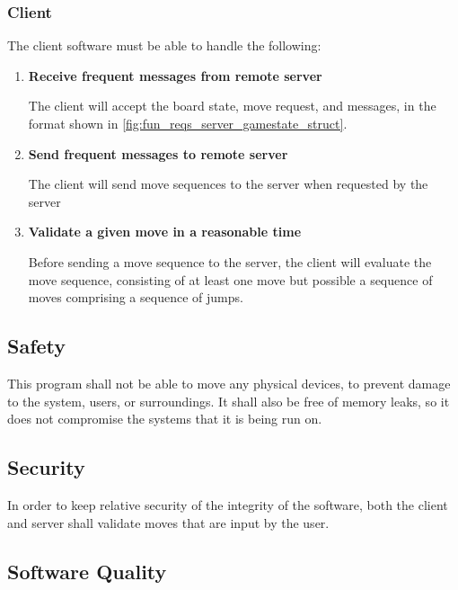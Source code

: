 \documentclass[letterpaper]{article}
\begin{document}
\subsubsection{Client}

The client software must be able to handle the following:

\begin{enumerate}
    \item \textbf{Receive frequent messages from remote server}
          
          The client will accept the board state, move request,
          and messages, in the format shown in 
          \cref{fig:fun_reqs_server_gamestate_struct}.
          
    \item \textbf{Send frequent messages to remote server}
          
          The client will send move sequences to the server
          when requested by the server
          
    \item \textbf{Validate a given move in a reasonable time}
          
          Before sending a move sequence to the server, the
          client will evaluate the move sequence, consisting
          of at least one move but possible a sequence of
          moves comprising a sequence of jumps.
          
\end{enumerate}

\subsection{Safety}
\label{sec:nofun_reqs_safety}

This program shall not be able to move any physical devices, to 
prevent damage to the system, users, or surroundings. It shall
also be free of memory leaks, so it does not compromise the
systems that it is being run on.

\subsection{Security}
\label{sec:nofun_reqs_security}

In order to keep relative security of the integrity of the
software, both the client and server shall validate moves that
are input by the user.

\subsection{Software Quality}
\label{sec:nofun_reqs_quality}
\end{document}
